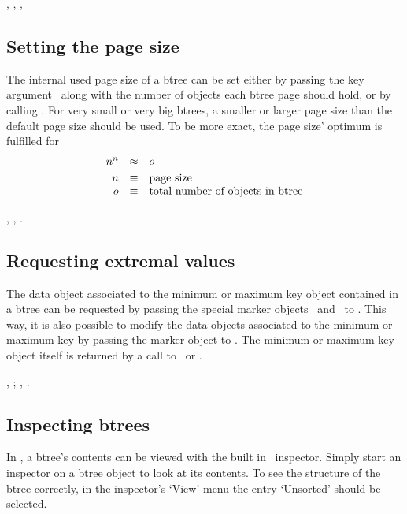  {}, ,
, 

\subsection{Setting the page size}

The internal used page size of a btree can be set either by passing
the key argument \ along with the number of objects
each btree page should hold, or by calling . For very small or very big btrees, a smaller
or larger page size than the default page size should be used. To
be more exact, the page size' optimum is fulfilled for
\begin{displaymath}\begin{array}{rcl}
%
n^{n} &\approx& o\\[\smallskipamount]
%
n &\equiv& \textrm{page size}\\
o &\equiv& \textrm{total number of objects in btree}
\end{array}\end{displaymath}

 {}, ,
.

\subsection{Requesting extremal values}

The data object associated to the minimum or maximum key object
contained in a btree can be requested by passing the special marker
objects \ and \ to
. This way, it is also possible to modify the data
objects associated to the minimum or maximum key by passing the
marker object to .  The minimum or maximum
key object itself is returned by a call to \ 
or .

 {}, ;
, \fcite{btree-maxkey}.

\subsection{Inspecting btrees}

In \lwcl, a btree's contents can be viewed with the built in \lw\
inspector. Simply start an inspector on a btree object to look at its
contents. To see the structure of the btree correctly, in the
inspector's `View' menu the entry `Unsorted' should be selected.

